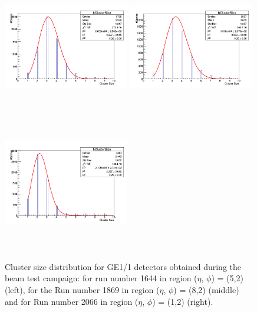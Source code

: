 \begin{figure}[!htbp]
    \centering
    \includegraphics[width=5.5cm,height=6cm]{figures/GEM/Run1644.png}%
    \includegraphics[width=5.5cm,height=6cm]{figures/GEM/Run1869.png}%
    \includegraphics[width=5.5cm,height=6cm]{figures/GEM/Run2066.png}
    \caption{Cluster size distribution for GE1/1 detectors obtained during the beam test campaign: for run number 1644 in region ($\eta$, $\phi$) = (5,2) (left), for the Run number 1869 in region ($\eta$, $\phi$) = (8,2) (middle) and for Run number 2066 in region ($\eta$, $\phi$) = (1,2) (right).}
    \label{fig:CSDpoissonfunction}
\end{figure}
